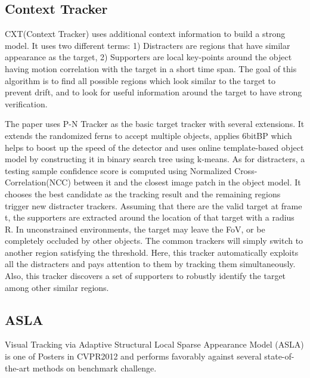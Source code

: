\documentclass{acm_proc_article-sp}
\begin{document}
\subsection{Context Tracker}
    CXT(Context Tracker) uses additional context information to build a strong model. It uses two different terms: 1) Distracters are regions that have similar appearance as the target, 2) Supporters are local key-points around the object having motion correlation with the target in a short time span. The goal of this algorithm is to find all possible regions which look similar to the target to prevent drift, and to look for useful information around the target to have strong verification.
    
    The paper uses P-N Tracker as the basic target tracker with several extensions. It extends the randomized ferns to accept multiple objects, applies 6bitBP which helps to boost up the speed of the detector and uses online template-based object model by constructing it in binary search tree using k-means.
    \newline
    As for distracters, a testing sample confidence score is computed using Normalized Cross-Correlation(NCC) between it and the closest image patch in the object model. It chooses the best candidate as the tracking result and the remaining regions trigger new distracter trackers.
    \newline
    Assuming that there are the valid target at frame t, the supporters are extracted around the location of that target with a radius R.
    \newline
    In unconstrained environments, the target may leave the FoV, or be completely occluded by other objects. The common trackers will simply switch to another region satisfying the threshold. Here, this tracker automatically exploits all the distracters and pays attention to them by tracking them simultaneously. Also, this tracker discovers a set of supporters to robustly identify the target among other similar regions.

\subsection{ASLA}

\label{sec:asla_section}

Visual Tracking via Adaptive Structural Local Sparse Appearance Model (ASLA) is one of Posters in CVPR2012 and performs favorably against several state-of-the-art methods on benchmark challenge.
\end{document}
